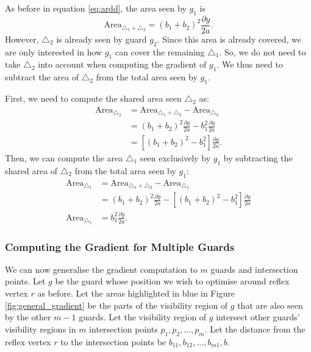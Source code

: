 As before in equation \ref{eq:ardd}, the area seen by $g_1$ is $$\text{Area}_{\triangle_1 + \triangle_2} = (b_1 + b_2)^2\frac{\partial y}{2a}.$$
However, $\triangle_2$ is already seen by guard $g_2$. Since this area is already covered, we are only interested in how $g_1$ can cover the remaining $\triangle_1$. So, we do not need to take $\triangle_2$ into account when computing the gradient of $g_1$. We thus need to subtract the area of $\triangle_2$ from the total area seen by $g_1$. 

First, we need to compute the shared area seen $\triangle_2$ as:
\begin{align}
    \text{Area}_{\triangle_2} &= \text{Area}_{\triangle_1 + \triangle_2} - \text{Area}_{\triangle_2} \\
                              &= (b_1 + b_2)^2\frac{\partial y}{2a} - b_1^2\frac{\partial y}{2a} \\
                              &= \left[(b_1 + b_2)^2 - b_1^2\right]\frac{\partial y}{2a}. \label{eq:multiple_areas} 
\end{align}
Then, we can compute the area $\triangle_1$ seen exclusively by $g_1$ by subtracting the shared area of $\triangle_2$ from the total area seen by $g_1$: 
\begin{align*}
    \text{Area}_{\triangle_1} &= \text{Area}_{\triangle_1 + \triangle_2} - \text{Area}_{\triangle_1} \\
                              &= (b_1 + b_2)^2\frac{\partial y}{2a} - \left[(b_1 + b_2)^2 - b_1^2\right]\frac{\partial y}{2a} \\
    \text{Area}_{\triangle_1} &= b_1^2\frac{\partial y}{2a}. 
\end{align*}

\subsubsection{Computing the Gradient for Multiple Guards}
We can now generalise the gradient computation to $m$ guards and intersection points. Let $g$ be the guard whose position we wish to optimise around reflex vertex $r$ as before. Let the areas highlighted in blue in Figure \ref{fig:general_gradient} be the parts of the visibility region of $g$ that are also seen by the other $m - 1$ guards. Let the visibility region of $g$ intersect other guards' visibility regions in $m$ intersection points $p_1, p_2, ..., p_m$. Let the distance from the reflex vertex $r$ to the intersection points be $b_{11}, b_{12}, ..., b_{m1}, b$.

